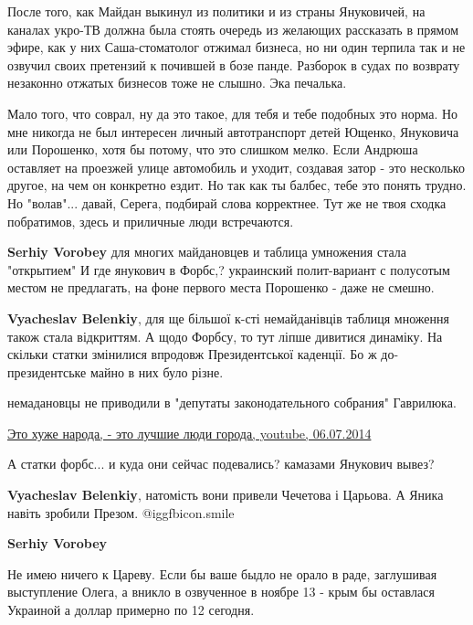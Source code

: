 \begin{itemize}
\begin{itemize}

После того, как Майдан выкинул из политики и из страны Януковичей, на каналах
укро-ТВ должна была стоять очередь из желающих рассказать в прямом эфире, как у
них Саша-стоматолог отжимал бизнеса, но ни один терпила так и не озвучил своих
претензий к почившей в бозе панде. Разборок в судах по возврату незаконно
отжатых бизнесов тоже не слышно. Эка печалька.



Мало того, что соврал, ну да это такое, для тебя и тебе подобных это норма. Но
мне никогда не был интересен личный автотранспорт детей Ющенко, Януковича или
Порошенко, хотя бы потому, что это слишком мелко. Если Андрюша оставляет на
проезжей улице автомобиль и уходит, создавая затор - это несколько другое, на
чем он конкретно ездит. Но так как ты балбес, тебе это понять трудно. Но
"волав"... давай, Серега, подбирай слова корректнее. Тут же не твоя сходка
побратимов, здесь и приличные люди встречаются.

\textbf{Serhiy Vorobey} для многих майдановцев и таблица умножения стала "открытием"
И где янукович в Форбс,? украинский полит-вариант с полусотым местом не предлагать, на фоне первого места Порошенко - даже не смешно.

\textbf{Vyacheslav Belenkiy}, для ще більшої к-сті немайданівців таблиця множення також стала відкриттям.
А щодо Форбсу, то тут ліпше дивитися динаміку. На скільки статки змінилися впродовж Президентської каденції. Бо ж до-президентське майно в них було різне.


немадановцы не приводили в "депутаты законодательного собрания" Гаврилюка. 

\href{https://www.youtube.com/watch?v=W1m-XKGevJc}{%
Это хуже народа, - это лучшие люди города, youtube, 06.07.2014%
}

А статки форбс... и куда они сейчас подевались? камазами Янукович вывез?

\textbf{Vyacheslav Belenkiy}, натомість вони привели Чечетова і Царьова. А Яника навіть зробили Презом.  @igg{fbicon.smile} 

\textbf{Serhiy Vorobey} 

Не имею ничего к Цареву. Если бы ваше быдло не орало в раде, заглушивая
выступление Олега, а вникло в озвученное в ноябре 13 - крым бы оставлася
Украиной а доллар примерно по 12 сегодня.


\end{itemize}
\end{itemize}
